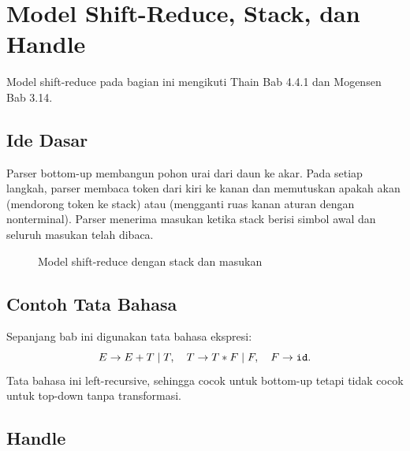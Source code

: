 \section{Model Shift-Reduce, Stack, dan Handle}
\label{sec:ch11-shift-reduce}

Model shift-reduce pada bagian ini mengikuti Thain Bab 4.4.1 dan
Mogensen Bab 3.14.

\subsection{Ide Dasar}

Parser bottom-up membangun pohon urai dari daun ke akar. Pada setiap
langkah, parser membaca token dari kiri ke kanan dan memutuskan
apakah akan  (mendorong token ke stack) atau
 (mengganti ruas kanan aturan dengan nonterminal).
Parser menerima masukan ketika stack berisi simbol awal dan seluruh
masukan telah dibaca.

\begin{figure}[H]
\centering
{}
\caption{Model shift-reduce dengan stack dan masukan}
\label{fig:ch11-model}
\end{figure}

\subsection{Contoh Tata Bahasa}

Sepanjang bab ini digunakan tata bahasa ekspresi:
\[
E \to E + T \mid T, \quad
T \to T * F \mid F, \quad
F \to \texttt{id}.
\]
Tata bahasa ini left-recursive, sehingga cocok untuk bottom-up tetapi
tidak cocok untuk top-down tanpa transformasi.

\subsection{Handle}

